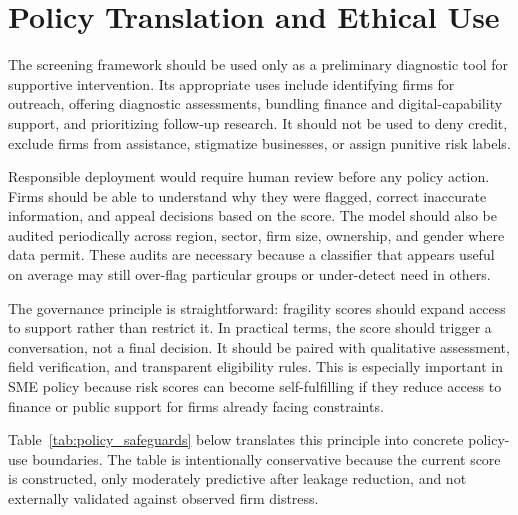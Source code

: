 \section{Policy Translation and Ethical Use}

The screening framework should be used only as a preliminary diagnostic tool for supportive intervention. Its appropriate uses include identifying firms for outreach, offering diagnostic assessments, bundling finance and digital-capability support, and prioritizing follow-up research. It should not be used to deny credit, exclude firms from assistance, stigmatize businesses, or assign punitive risk labels.

Responsible deployment would require human review before any policy action. Firms should be able to understand why they were flagged, correct inaccurate information, and appeal decisions based on the score. The model should also be audited periodically across region, sector, firm size, ownership, and gender where data permit. These audits are necessary because a classifier that appears useful on average may still over-flag particular groups or under-detect need in others.

The governance principle is straightforward: fragility scores should expand access to support rather than restrict it. In practical terms, the score should trigger a conversation, not a final decision. It should be paired with qualitative assessment, field verification, and transparent eligibility rules. This is especially important in SME policy because risk scores can become self-fulfilling if they reduce access to finance or public support for firms already facing constraints.

Table~\ref{tab:policy_safeguards} below translates this principle into concrete policy-use boundaries. The table is intentionally conservative because the current score is constructed, only moderately predictive after leakage reduction, and not externally validated against observed firm distress.

\begin{table}[H]
\centering
\caption{Policy-Use Safeguards for SME Fragility Scores}
\label{tab:policy_safeguards}
\small
\resizebox{\textwidth}{!}{}
\end{table}
